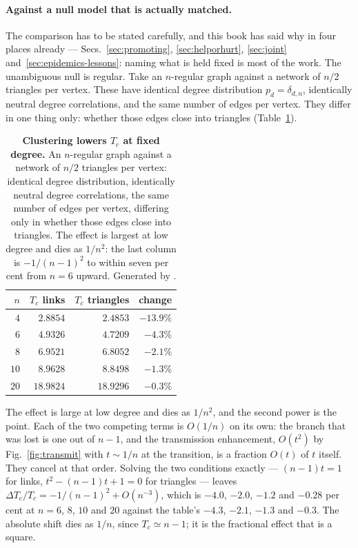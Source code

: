 \paragraph{Against a null model that is actually matched.} The comparison has to
be stated carefully, and this book has said why in four places already ---
Secs.~\ref{sec:promoting}, \ref{sec:helporhurt}, \ref{sec:joint}
and~\ref{sec:epidemics-lessons}: naming what is held fixed is most of the work. The unambiguous null is regular. Take an
$n$-regular graph against a network of $n/2$ triangles per vertex. These have
identical degree distribution $p_{d}=\delta_{d,n}$, identically neutral degree
correlations, and the same number of edges per vertex. They differ in one thing
only: whether those edges close into triangles (Table~\ref{tab:trianglenull}).
\begin{table}[t]
\centering\small
\begin{tabular}{rrrr}
\hline\hline
$n$ & $T_{c}$ links & $T_{c}$ triangles & change\\
\hline
$4$ & $2.8854$ & $2.4853$ & $-13.9\%$\\
$6$ & $4.9326$ & $4.7209$ & $-4.3\%$\\
$8$ & $6.9521$ & $6.8052$ & $-2.1\%$\\
$10$ & $8.9628$ & $8.8498$ & $-1.3\%$\\
$20$ & $18.9824$ & $18.9296$ & $-0.3\%$\\
\hline\hline
\end{tabular}
\caption{\textbf{Clustering lowers $T_{c}$ at fixed degree.} An $n$-regular graph against a network of $n/2$ triangles per vertex: identical degree distribution, identically neutral degree correlations, the same number of edges per vertex, differing only in whether those edges close into triangles. The effect is largest at low degree and dies as $1/n^{2}$: the last column is $-1/(n-1)^{2}$ to within seven per cent from $n=6$ upward. Generated by .}
\label{tab:trianglenull}
\end{table}
The effect is large at low degree and dies as $1/n^{2}$, and the second power
is the point. Each of the two competing terms is $O(1/n)$ on its own: the branch
that was lost is one out of $n-1$, and the transmission enhancement, $O(t^{2})$
by Fig.~\ref{fig:transmit} with $t\sim1/n$ at the transition, is a fraction
$O(t)$ of $t$ itself. They cancel at that order. Solving the two conditions
exactly --- $(n-1)t=1$ for links, $t^{2}-(n-1)t+1=0$ for triangles --- leaves
$\Delta T_{c}/T_{c}=-1/(n-1)^{2}+O(n^{-3})$, which is $-4.0$, $-2.0$, $-1.2$ and
$-0.28$ per cent at $n=6$, $8$, $10$ and $20$ against the table's $-4.3$, $-2.1$,
$-1.3$ and $-0.3$. The absolute shift dies as $1/n$, since $T_{c}\simeq n-1$; it
is the fractional effect that is a square.

